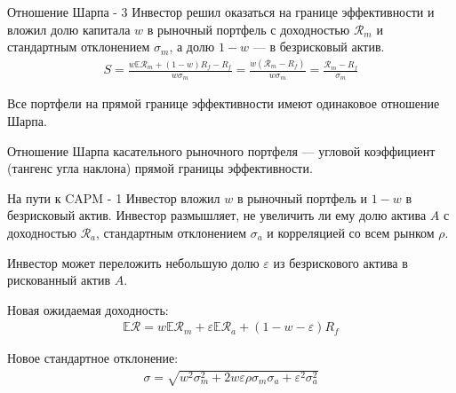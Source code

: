 \documentclass{beamer}
\begin{document}
\begin{frame}{Отношение Шарпа - 3}
\justify
Инвестор решил оказаться на границе эффективности и вложил долю капитала $w$ в 
рыночный портфель с доходностью $\mathcal{R}_{m}$ и стандартным отклонением
$\sigma_{m}$, а долю $1-w$ --- в безрисковый актив.
\begin{align*}
S = \frac{w\mathbb{E}\mathcal{R}_{m} + (1-w)R_f - R_f}{w\sigma_{m}} = 
\frac{w(\mathcal{R}_{m} - R_f)}{w\sigma_{m}} =
\frac{\mathcal{R}_{m} - R_f}{\sigma_{m}}
\end{align*}

\justify
Все портфели на прямой границе эффективности имеют одинаковое отношение Шарпа.

\justify
Отношение Шарпа касательного рыночного портфеля --- угловой коэффициент 
(тангенс угла наклона) прямой границы эффективности.
\end{frame}



\begin{frame}{На пути к CAPM - 1}
\justify
Инвестор вложил $w$ в рыночный портфель и $1-w$ в безрисковый актив. Инвестор 
размышляет, не увеличить ли ему долю актива $A$ с доходностью
$\mathcal{R}_{a}$, стандартным отклонением $\sigma_{a}$ и корреляцией со всем рынком
$\rho$.

\justify
Инвестор может переложить небольшую долю $\varepsilon$ из безрискового актива в 
рискованный актив $A$.

\justify
Новая ожидаемая доходность:
\begin{align*}
\mathbb{E}\mathcal{R} =
w\mathbb{E}\mathcal{R}_{m} + 
\varepsilon\mathbb{E}\mathcal{R}_a +
(1 - w - \varepsilon)R_{f}
\end{align*}

\justify
Новое стандартное отклонение:
\begin{align*}
\sigma = \sqrt{
	w^2\sigma_m^2 +
	2w\varepsilon\rho\sigma_m\sigma_a + \varepsilon^2\sigma_a^2
}
\end{align*}
\end{frame}
\end{document}
